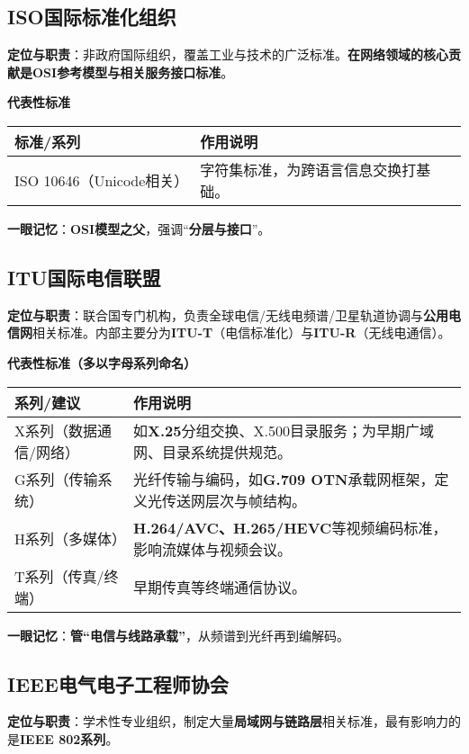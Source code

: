 \documentclass[lang=cn,newtx,10pt,scheme=chinese]{../../elegantbook}
\begin{document}
\subsection{ISO国际标准化组织}
	\textbf{定位与职责}：非政府国际组织，覆盖工业与技术的广泛标准。\textbf{在网络领域的核心贡献是OSI参考模型与相关服务接口标准}。

	\textbf{代表性标准}
\begin{longtable}{|p{4cm}|p{8cm}|}
\hline
	\textbf{标准/系列} & \textbf{作用说明} \\
\hline
ISO 10646（Unicode相关） & 字符集标准，为跨语言信息交换打基础。 \\
\hline
\end{longtable}

	\textbf{一眼记忆}：\textbf{OSI模型之父}，强调“\textbf{分层与接口}”。

\subsection{ITU国际电信联盟}
	\textbf{定位与职责}：联合国专门机构，负责全球电信/无线电频谱/卫星轨道协调与\textbf{公用电信网}相关标准。内部主要分为\textbf{ITU-T}（电信标准化）与\textbf{ITU-R}（无线电通信）。

	\textbf{代表性标准（多以字母系列命名）}
\begin{longtable}{|p{3.5cm}|p{8.5cm}|}
\hline
	\textbf{系列/建议} & \textbf{作用说明} \\
\hline
X系列（数据通信/网络） & 如\textbf{X.25}分组交换、X.500目录服务；为早期广域网、目录系统提供规范。 \\
\hline
G系列（传输系统） & 光纤传输与编码，如\textbf{G.709 OTN}承载网框架，定义光传送网层次与帧结构。 \\
\hline
H系列（多媒体） & \textbf{H.264/AVC、H.265/HEVC}等视频编码标准，影响流媒体与视频会议。 \\
\hline
T系列（传真/终端） & 早期传真等终端通信协议。 \\
\hline
\end{longtable}

	\textbf{一眼记忆}：\textbf{管“电信与线路承载”}，从频谱到光纤再到编解码。

\subsection{IEEE电气电子工程师协会}
	\textbf{定位与职责}：学术性专业组织，制定大量\textbf{局域网与链路层}相关标准，最有影响力的是\textbf{IEEE 802系列}。
\end{document}
